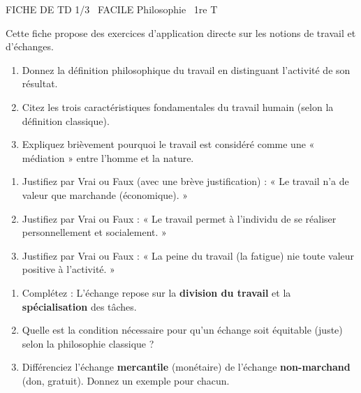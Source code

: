 \documentclass[11pt]{article}
\begin{document}
\begin{tcolorbox}[enhanced,colback=popink,colframe=popink,arc=10pt,boxrule=0pt,left=12pt,right=12pt,top=9pt,bottom=9pt]
{\color{white}\popxbold\small FICHE DE TD 1/3 \textbullet\ FACILE \hfill Philosophie \textbullet\ 1re T\par}
\end{tcolorbox}
\vspace{4pt}
Cette fiche propose des exercices d'application directe sur les notions de travail et d'échanges.

\begin{exercice}
\begin{enumerate}
    \item Donnez la définition philosophique du travail en distinguant l'activité de son résultat.
    \item Citez les trois caractéristiques fondamentales du travail humain (selon la définition classique).
    \item Expliquez brièvement pourquoi le travail est considéré comme une « médiation » entre l'homme et la nature.
\end{enumerate}
\end{exercice}

\begin{exercice}
\begin{enumerate}
    \item Justifiez par Vrai ou Faux (avec une brève justification) : « Le travail n'a de valeur que marchande (économique). »
    \item Justifiez par Vrai ou Faux : « Le travail permet à l'individu de se réaliser personnellement et socialement. »
    \item Justifiez par Vrai ou Faux : « La peine du travail (la fatigue) nie toute valeur positive à l'activité. »
\end{enumerate}
\end{exercice}

\begin{exercice}
\begin{enumerate}
    \item Complétez : L'échange repose sur la \textbf{division du travail} et la \textbf{spécialisation} des tâches.
    \item Quelle est la condition nécessaire pour qu'un échange soit équitable (juste) selon la philosophie classique ?
    \item Différenciez l'échange \textbf{mercantile} (monétaire) de l'échange \textbf{non-marchand} (don, gratuit). Donnez un exemple pour chacun.
\end{enumerate}
\end{exercice}
\end{document}
